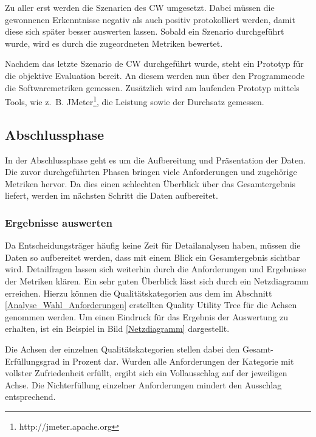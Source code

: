 Zu aller erst werden die Szenarien des \ac{CW} umgesetzt. Dabei müssen die gewonnenen Erkenntnisse negativ als auch positiv protokolliert werden, damit diese sich später besser auswerten lassen. Sobald ein Szenario durchgeführt wurde, wird es durch die zugeordneten Metriken bewertet.

Nachdem das letzte Szenario de \ac{CW} durchgeführt wurde, steht ein Prototyp für die objektive Evaluation bereit. An diesem werden nun über den Programmcode die Softwaremetriken gemessen. Zusätzlich wird am laufenden Prototyp mittels Tools, wie z.~B. JMeter\footnote{http://jmeter.apache.org}, die Leistung sowie der Durchsatz gemessen.

\subsection{Abschlussphase}


In der Abschlussphase geht es um die Aufbereitung und Präsentation der Daten. Die zuvor durchgeführten Phasen bringen viele Anforderungen und zugehörige Metriken hervor. Da dies einen schlechten Überblick über das Gesamtergebnis liefert, werden im nächsten Schritt die Daten aufbereitet.

\subsubsection{Ergebnisse auswerten}\label{Ergebnisse_auswerten}

Da Entscheidungsträger häufig keine Zeit für Detailanalysen haben, müssen die Daten so aufbereitet werden, dass mit einem Blick ein Gesamtergebnis sichtbar wird. Detailfragen lassen sich weiterhin durch die Anforderungen und Ergebnisse der Metriken klären. Ein sehr guten Überblick lässt sich durch ein Netzdiagramm erreichen. Hierzu können die Qualitätskategorien aus dem im Abschnitt \ref{Analyse_Wahl_Anforderungen} erstellten Quality Utility Tree für die Achsen genommen werden. Um einen Eindruck für das Ergebnis der Auswertung zu erhalten, ist ein Beispiel in Bild \ref{Netzdiagramm} dargestellt.


Die Achsen der einzelnen Qualitätskategorien stellen dabei den Gesamt-Erfüllungsgrad in Prozent dar. Wurden alle Anforderungen der Kategorie mit vollster Zufriedenheit erfüllt, ergibt sich ein Vollausschlag auf der jeweiligen Achse. Die Nichterfüllung einzelner Anforderungen mindert den Ausschlag entsprechend.

